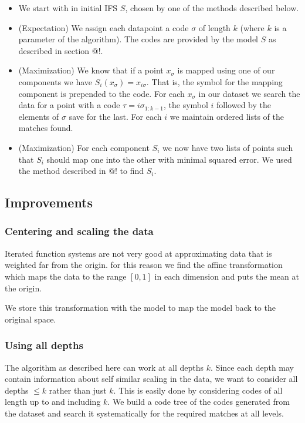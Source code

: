 \documentclass[11pt]{article}
\theoremstyle{definition}
\begin{document}
\begin{itemize}
\item We start with in initial IFS $S$, chosen by one of the methods described below. 
\item (Expectation) We assign each datapoint a code $\sigma$ of length $k$ (where $k$ is a parameter of the algorithm). The codes are provided by the model $S$ as described in section @!.
\item (Maximization) We know that if a point $x_\sigma$ is mapped using one of our components we have $S_i(x_\sigma) = x_{i\sigma}$. That is, the symbol for the mapping component is prepended to the code. For each $x_\sigma$ in our dataset we search the data for a point with a code $\tau = i\sigma_{1:k-1}$, the symbol $i$ followed by the elements of $\sigma$ save for the last. For each $i$ we maintain ordered lists of the matches found.
\item (Maximization) For each component $S_i$ we now have two lists of points such that $S_i$ should map one into the other with minimal squared error. We used the method described in @! to find $S_i$. 
\end{itemize}
 
\subsection{Improvements}

\subsubsection{Centering and scaling the data}

Iterated function systems are not very good at approximating data that is weighted far from the origin. for this reason we find the affine transformation which maps the data to the range $[0,1]$ in each dimension and puts the mean at the origin.

We store this transformation with the model to map the model back to the original space.

\subsubsection{Using all depths}

The algorithm as described here can work at all depths $k$. Since each depth may contain information about self similar scaling in the data, we want to consider all depths $\leq k$ rather than just $k$. This is easily done by considering codes of all length up to and including $k$. We build a code tree of the codes generated from the dataset and search it systematically for the required matches at all levels.
\end{document}
